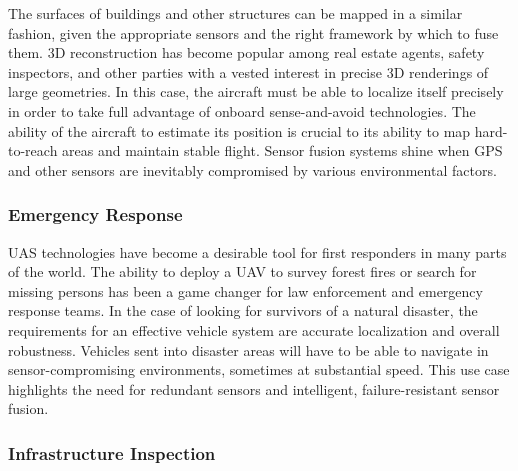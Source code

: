 The surfaces of buildings and other structures can be mapped in a similar fashion, given the appropriate sensors and the right framework by which to fuse them. 3D reconstruction has become popular among real estate agents, safety inspectors, and other parties with a vested interest in precise 3D renderings of large geometries. In this case, the aircraft must be able to localize itself precisely in order to take full advantage of onboard sense-and-avoid technologies. The ability of the aircraft to estimate its position is crucial to its ability to map hard-to-reach areas and maintain stable flight. Sensor fusion systems shine when GPS and other sensors are inevitably compromised by various environmental factors.

\subsubsection{Emergency Response}

UAS technologies have become a desirable tool for first responders in many parts of the world. The ability to deploy a UAV to survey forest fires or search for missing persons has been a game changer for law enforcement and emergency response teams. In the case of looking for survivors of a natural disaster, the requirements for an effective vehicle system are accurate localization and overall robustness. Vehicles sent into disaster areas will have to be able to navigate in sensor-compromising environments, sometimes at substantial speed. This use case highlights the need for redundant sensors and intelligent, failure-resistant sensor fusion.

\subsubsection{Infrastructure Inspection}

